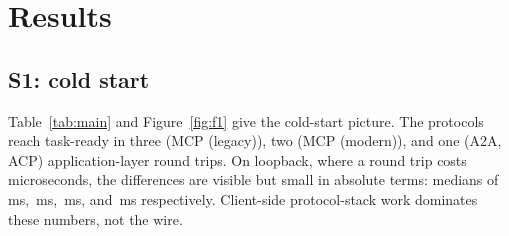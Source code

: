 \documentclass[10pt]{article}
\newcommand{\mcpl}{MCP (legacy)}
\newcommand{\mcpm}{MCP (modern)}
\begin{document}
\section{Results}
\label{sec:results}

\begin{table}[t]
\centering
\footnotesize\setlength{\tabcolsep}{4pt}
\caption{Main results. Medians over $N{=}\NRuns$ runs per cell; RT =
application-layer round trips to task-ready (or to rejection for S3);
Conn = TCP connections opened; wire bytes are relay-counted through
task-ready (localhost condition shown). p95 in adjacent columns.}
\label{tab:main}

\end{table}

\subsection{S1: cold start}
\label{sec:results-s1}

Table~\ref{tab:main} and Figure~\ref{fig:f1} give the cold-start picture.
The protocols reach task-ready in three (\mcpl{}), two (\mcpm{}), and one
(A2A, ACP) application-layer round trips. On loopback, where a round trip
costs microseconds, the differences are visible but small in absolute
terms: medians of \SOneMcpLegacyLocalMed{}\,ms,
\SOneMcpModernLocalMed{}\,ms, \SOneAtoaLocalMed{}\,ms, and
\SOneAcpLocalMed{}\,ms respectively. Client-side protocol-stack work
dominates these numbers, not the wire.
\end{document}
